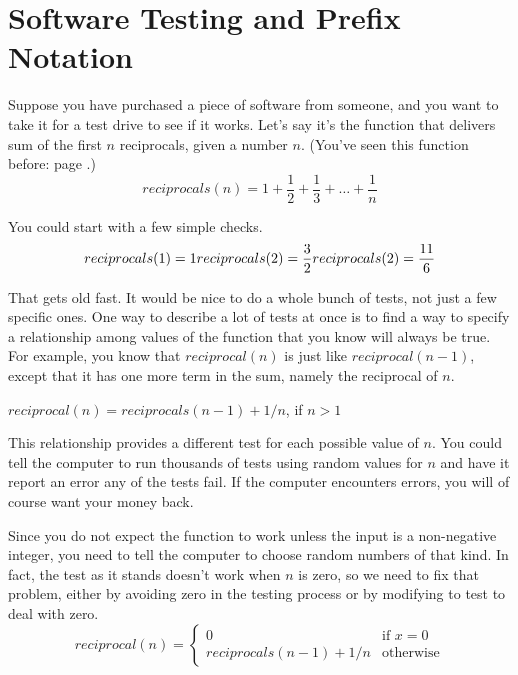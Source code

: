 \chapter{Software Testing and Prefix Notation}

Suppose you have purchased a piece of software from someone, and you want to take it for a test drive to see if it works. Let's say it's the function that delivers sum of the first $n$ reciprocals, given a number $n$.
(You've seen this function before: page \pageref{harmonic-series-math-def}.)
\begin{displaymath}
reciprocals(n) = 1 + \frac{1}{2} + \frac{1}{3} + \dots + \frac{1}{n}
\end{displaymath}

You could start with a few simple checks.
\begin{displaymath}
 reciprocals(1) = 1
\\
 reciprocals(2) = \frac{3}{2}
\\
 reciprocals(2) = \frac{11}{6}
\end{displaymath}

That gets old fast. It would be nice to do a whole bunch of tests,
not just a few specific ones.
One way to describe a lot of tests at once is to find a way to specify
a relationship among values of the function that you know will always be true.
For example, you know that $reciprocal(n)$ is just like $reciprocal(n-1)$,
except that it has one more term in the sum, namely the reciprocal of $n$.
\begin{center}
 $reciprocal(n) = reciprocals(n-1) + 1/n$, if $n > 1$
\end{center}

This relationship provides a different test for each possible value of $n$.
You could tell the computer to run thousands of tests
using random values for $n$ and have it report an error any of the tests fail.
If the computer encounters errors, you will of course want your money back.

Since you do not expect the function to work unless the input
is a non-negative integer, you need to tell the computer
to choose random numbers of that kind.
In fact, the test as it stands doesn't work when $n$ is zero,
so we need to fix that problem, either by avoiding zero
in the testing process or by modifying to test to deal with zero.
\begin{displaymath}
reciprocal(n) =
\left\{
        \begin{array}{ll}
                0                      & \mbox{if } x = 0 \\
                reciprocals(n-1) + 1/n & \mbox{otherwise}
        \end{array}
\right.
\end{displaymath}

